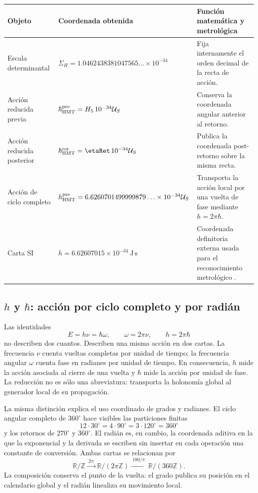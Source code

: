 \begin{center}
\begin{tabularx}{0.96\textwidth}{@{}L{0.22\textwidth}L{0.36\textwidth}Y@{}}
\toprule
Objeto & Coordenada obtenida & Función matemática y metrológica\\
\midrule
Escala determinantal &
\(\Sigma_H=1.0462438381047565\ldots\times10^{-34}\) &
Fija internamente el orden decimal de la recta de acción.\\
Acción reducida previa &
\(\hbar_{\rm HMT}^{\rm pre}=H_5\,10^{-34}\mathcal U_S\) &
Conserva la coordenada angular anterior al retorno.\\
Acción reducida posterior &
\(\hbar_{\rm HMT}^{\rm ret}=\etaRet\,10^{-34}\mathcal U_S\) &
Publica la coordenada post-retorno sobre la misma recta.\\
Acción de ciclo completo &
\(h_{\rm HMT}^{\rm pre}=6.6260701499999879\ldots\times10^{-34}\mathcal U_S\) &
Transporta la acción local por una vuelta de fase mediante \(h=2\pi\hbar\).\\
Carta SI &
\(h=6.62607015\times10^{-34}\ \mathrm{J\,s}\) &
Coordenada definitoria externa usada para el reconocimiento metrológico
\cite{BIPMSI}.\\
\bottomrule
\end{tabularx}
\end{center}

\subsection{\texorpdfstring{\(h\)}{h} y
\texorpdfstring{\(\hbar\)}{h barra}: acción por ciclo completo y por radián}
\label{sec:accion-vuelta-radian-rev6}

Las identidades
\[
 E=h\nu=\hbar\omega,\qquad
 \omega=2\pi\nu,\qquad
 h=2\pi\hbar
\]
no describen dos cuantos. Describen una misma acción en dos cartas. La
frecuencia \(\nu\) cuenta vueltas completas por unidad de tiempo; la
frecuencia angular \(\omega\) cuenta fase en radianes por unidad de tiempo.
En consecuencia, \(h\) mide la acción asociada al cierre de una vuelta y
\(\hbar\) mide la acción por unidad de fase. La reducción no es sólo una
abreviatura: transporta la holonomía global al generador local de su
propagación.

La misma distinción explica el uso coordinado de grados y radianes. El ciclo
angular completo de \(360^\circ\) hace visibles las particiones finitas
\[
 12\cdot30^\circ=4\cdot90^\circ
 =3\cdot120^\circ=360^\circ
\]
y los retornos de \(270^\circ\) y \(360^\circ\). El radián es, en cambio,
la coordenada aditiva en la que la exponencial y la derivada se escriben sin
insertar en cada operación una constante de conversión. Ambas cartas se
relacionan por
\[
 \mathbb R/\mathbb Z
 \xrightarrow{\;2\pi\;}
 \mathbb R/(2\pi\mathbb Z)
 \xrightarrow{\;180/\pi\;}
 \mathbb R/(360\mathbb Z).
\]
La composición conserva el punto de la vuelta: el grado publica su posición
en el calendario global y el radián linealiza su movimiento local.

